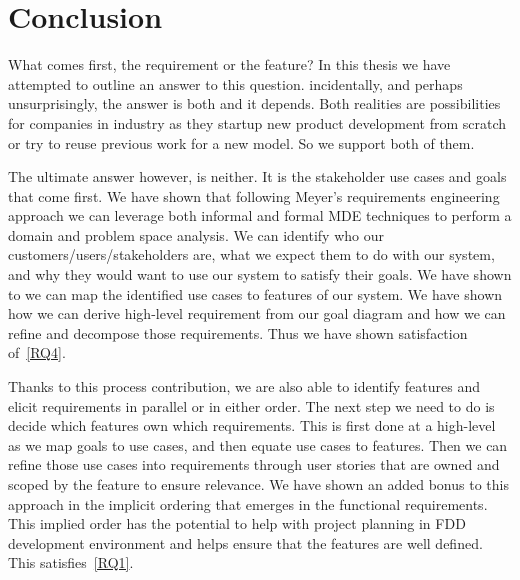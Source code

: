 \chapter{Conclusion}


What comes first, the requirement or the feature? In this thesis we have attempted to outline an answer to this question. incidentally, and perhaps unsurprisingly, the answer is both and it depends. Both realities are possibilities for companies in industry as they startup new product development from scratch or try to reuse previous work for a new model. So we support both of them. 

The ultimate answer however, is neither. It is the stakeholder use cases and goals that come first. We have shown that following Meyer's requirements engineering approach we can leverage both informal and formal \ac{MDE} techniques to perform a domain and problem space analysis. We can identify who our customers/users/stakeholders are, what we expect them to do with our system, and why they would want to use our system to satisfy their goals. We have shown to we can map the identified use cases to features of our system. We have shown how we can derive high-level requirement from our goal diagram and how we can refine and decompose those requirements. Thus we have shown satisfaction of~\ref{RQ4}.

Thanks to this process contribution, we are also able to identify features and elicit requirements in parallel or in either order. The next step we need to do is decide which features own which requirements. This is first done at a high-level as we map goals to use cases, and then equate use cases to features. Then we can refine those use cases into requirements through user stories that are owned and scoped by the feature to ensure relevance. We have shown an added bonus to this approach in the implicit ordering that emerges in the functional requirements. This implied order has the potential to help with project planning in \ac{FDD} development environment and helps ensure that the features are well defined. This satisfies~\ref{RQ1}.



